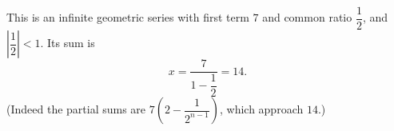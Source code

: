 This is an infinite geometric series with first term $7$ and common ratio $\dfrac{1}{2}$, and $\left|\dfrac{1}{2}\right|<1$. Its sum is
\[
x=\dfrac{7}{1-\dfrac{1}{2}}=\boxed{14}.
\]
(Indeed the partial sums are $7\left(2-\dfrac{1}{2^{n-1}}\right)$, which approach $14$.)
